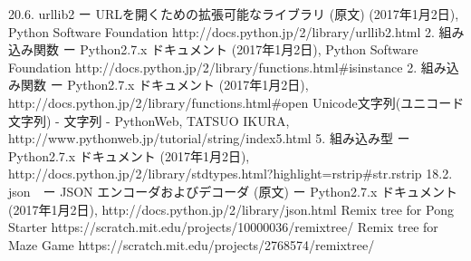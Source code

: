 \documentclass[a4paper,10pt,onecolumn,oneside,openany]{jsbook}
\begin{document}
\begin{thebibliography}{23}
 20.6. urllib2 ー URLを開くための拡張可能なライブラリ (原文) (2017年1月2日), Python Software Foundation http://docs.python.jp/2/library/urllib2.html
 2. 組み込み関数 ー Python2.7.x ドキュメント (2017年1月2日), Python Software Foundation http://docs.python.jp/2/library/functions.html\#isinstance
 2. 組み込み関数 ー Python2.7.x ドキュメント (2017年1月2日), http://docs.python.jp/2/library/functions.html\#open
 Unicode文字列(ユニコード文字列) - 文字列 - PythonWeb, TATSUO IKURA, http://www.pythonweb.jp/tutorial/string/index5.html
 5. 組み込み型 ー Python2.7.x ドキュメント (2017年1月2日), http://docs.python.jp/2/library/stdtypes.html?highlight=rstrip\#str.rstrip
 18.2. json　ー JSON エンコーダおよびデコーダ (原文) ー Python2.7.x ドキュメント (2017年1月2日), http://docs.python.jp/2/library/json.html
Remix tree for Pong Starter https://scratch.mit.edu/projects/10000036/remixtree/
Remix tree for Maze Game https://scratch.mit.edu/projects/2768574/remixtree/




\end{thebibliography}

\newpage
\appendix
\chapter{}




\newpage



\newpage
\printindex
%
%
\end{document}
